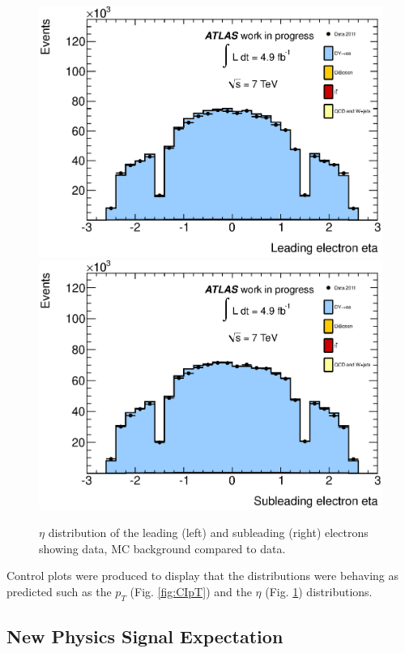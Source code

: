 	\begin{figure}[h!]
	\centering
	\includegraphics[width=0.49\linewidth]{images/lead_eta.eps}
	\includegraphics[width=0.49\linewidth]{images/sub_eta.eps}
	\caption{$\eta$ distribution of the leading (left) and subleading (right) electrons showing data, MC background compared to data.}
	\label{fig:eta}
	\end{figure}

	Control plots were produced to display that the distributions were behaving as predicted such as the $p_{T}$ (Fig. \ref{fig:CIpT}) and the $\eta$ (Fig. \ref{fig:eta}) distributions.





\subsection{New Physics Signal Expectation}

